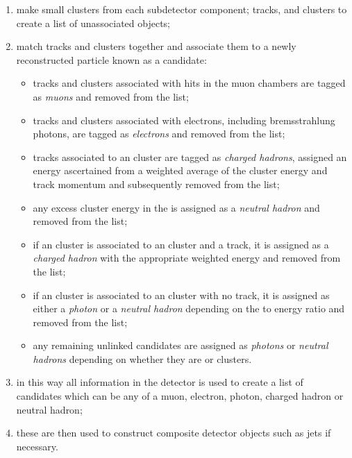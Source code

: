 \begin{enumerate}
  \item{make small clusters from each subdetector component; tracks, \ECAL and \HCAL clusters to create a list of unassociated objects;}
  \item{match tracks and clusters together and associate them to a newly reconstructed particle known as a \PF candidate:}
  \begin{itemize}
    \item{tracks and clusters associated with hits in the muon chambers are tagged as \emph{muons} and removed from the list;}
    \item{tracks and clusters associated with electrons, including bremsstrahlung photons, are tagged as \emph{electrons} and removed from the list;}
    \item{tracks associated to an \HCAL cluster are tagged as \emph{charged hadrons}, assigned an energy ascertained from a weighted average of the cluster energy and track momentum and subsequently removed from the list;}
    \item{any excess cluster energy in the \HCAL is assigned as a \emph{neutral hadron} and removed from the list;}
    \item{if an \ECAL cluster is associated to an \HCAL cluster and a track, it is assigned as a \emph{charged hadron} with the appropriate weighted energy and removed from the list;}
    \item{if an \ECAL cluster is associated to an \HCAL cluster with no track, it is assigned as either a \emph{photon} or a \emph{neutral hadron} depending on the \HCAL to \ECAL energy ratio and removed from the list;}
    \item{any remaining unlinked candidates are assigned as \emph{photons} or \emph{neutral hadrons} depending on whether they are \ECAL or \HCAL clusters.}
  \end{itemize}
  \item{in this way all information in the detector is used to create a list of candidates which can be any of a muon, electron, photon, charged hadron or neutral hadron;}
  \item{these are then used to construct composite detector objects such as jets if necessary.}
\end{enumerate}

